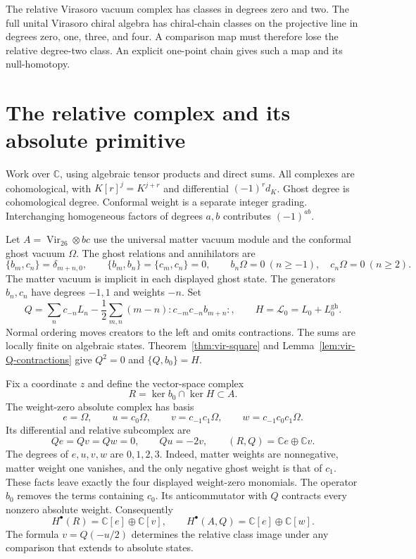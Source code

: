 The relative Virasoro vacuum complex has classes in degrees zero and two.
The full unital Virasoro chiral algebra has chiral-chain classes on the projective line in degrees zero, one, three, and four.
A comparison map must therefore lose the relative degree-two class.
An explicit one-point chain gives such a map and its null-homotopy.

\section{The relative complex and its absolute primitive}

Work over $\mathbb C$, using algebraic tensor products and direct sums.
All complexes are cohomological, with $K[r]^j=K^{j+r}$ and differential $(-1)^r d_K$.
Ghost degree is cohomological degree.
Conformal weight is a separate integer grading.
Interchanging homogeneous factors of degrees $a,b$ contributes $(-1)^{ab}$.

Let $A=\operatorname{Vir}_{26}\otimes bc$ use the universal matter vacuum module and the conformal ghost vacuum $\Omega$.
The ghost relations and annihilators are
\[
 \{b_m,c_n\}=\delta_{m+n,0},\qquad
 \{b_m,b_n\}=\{c_m,c_n\}=0,
 \qquad b_n\Omega=0\ (n\geq-1),\quad c_n\Omega=0\ (n\geq2).
\]
The matter vacuum is implicit in each displayed ghost state.
The generators $b_n,c_n$ have degrees $-1,1$ and weights $-n$.
Set
\[
 Q=\sum_n c_{-n}L_n
 -\frac12\sum_{m,n}(m-n):c_{-m}c_{-n}b_{m+n}:,
 \qquad H=\mathcal L_0=L_0+L_0^{\mathrm{gh}}.
\]
Normal ordering moves creators to the left and omits contractions.
The sums are locally finite on algebraic states.
Theorem~\ref{thm:vir-square} and Lemma~\ref{lem:vir-Q-contractions} give
$Q^2=0$ and $\{Q,b_0\}=H$.

Fix a coordinate $z$ and define the vector-space complex
\[
 R=\ker b_0\cap\ker H\subset A.
\]
The weight-zero absolute complex has basis
\[
 e=\Omega,\qquad u=c_0\Omega,\qquad
 v=c_{-1}c_1\Omega,\qquad w=c_{-1}c_0c_1\Omega.
\]
Its differential and relative subcomplex are
\begin{equation}\label{eq:rp-four}
 Qe=Qv=Qw=0,\qquad Qu=-2v,
 \qquad (R,Q)=\mathbb Ce\oplus\mathbb Cv.
\end{equation}
The degrees of $e,u,v,w$ are $0,1,2,3$.
Indeed, matter weights are nonnegative, matter weight one vanishes, and the only negative ghost weight is that of $c_1$.
These facts leave exactly the four displayed weight-zero monomials.
The operator $b_0$ removes the terms containing $c_0$.
Its anticommutator with $Q$ contracts every nonzero absolute weight.
Consequently
\[
 H^\bullet(R)=\mathbb C[e]\oplus\mathbb C[v],\qquad
 H^\bullet(A,Q)=\mathbb C[e]\oplus\mathbb C[w].
\]
The formula $v=Q(-u/2)$ determines the relative class image under any comparison that extends to absolute states.

